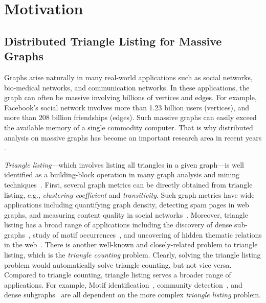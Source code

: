 \section{Motivation}
\label{sec:motivation}
\subsection{Distributed Triangle Listing for Massive Graphs}
Graphs arise naturally in many real-world applications such as social networks, bio-medical networks, and communication networks.
In these applications, the graph can often be massive involving billions of vertices and edges.
For example,   Facebook's  social network involves more than 1.23 billion users (vertices), and more than 208 billion friendships (edges).
Such massive graphs can easily exceed the available memory of a single commodity computer.
That is why distributed analysis on massive graphs has become an important research area in recent years \cite{Pregel,PowerGraph}.

{\em Triangle listing}---which involves listing all triangles in a given graph---is well identified as a building-block operation
 in many graph analysis and mining techniques~\cite{Eckmann_Moses_2002, Khuller_Saha_2009}. 
First, several graph metrics can be directly obtained from triangle listing, e.g., {\em clustering coefficient} and {\em transitivity}. 
Such graph metrics have wide applications including quantifying graph density, detecting spam pages in web graphs, and measuring 
content quality in social networks~\cite{Becchetti_Boldi_Castillo_Gionis_2008}. 
Moreover, triangle listing has a broad range of applications including the discovery of dense sub-graphs~\cite{Khuller_Saha_2009}, 
study of motif occurrences~\cite{Milo_Shen-Orr_Itzkovitz_Kashtan_Chklovskii_2002}, 
and uncovering of hidden thematic relations in the web~\cite{Eckmann_Moses_2002}. 
%
There is another well-known and closely-related problem to triangle listing, which is the {\em triangle counting} problem. 
Clearly, solving the triangle listing problem would automatically solve triangle counting, but not vice versa.  
Compared to triangle counting, triangle listing serves a broader range of applications. 
For example, Motif identification~\cite{Milo_Shen-Orr_Itzkovitz_Kashtan_Chklovskii_2002},   
community detection~\cite{Berry_Hendrickson_LaViolette_Phillips_2011}, and dense subgraphs~\cite{Khuller_Saha_2009} 
are all dependent on the more complex {\em triangle listing} problem. 


